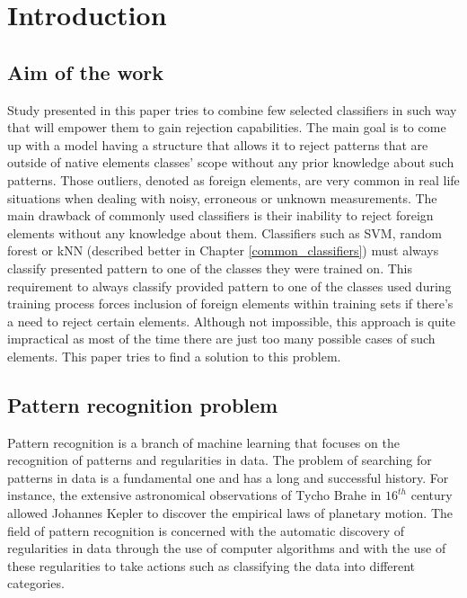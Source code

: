 \chapter{Introduction}

\section{Aim of the work}

Study presented in this paper tries to combine few selected classifiers in such way that will empower them to gain rejection capabilities. The main goal is to come up with a model having a structure that allows it to reject patterns that are outside of native elements classes' scope without any prior knowledge about such patterns. Those outliers, denoted as foreign elements, are very common in real life situations when dealing with noisy, erroneous or unknown measurements. The main drawback of commonly used classifiers is their inability to reject foreign elements without any knowledge about them. Classifiers such as SVM, random forest or kNN (described better in Chapter \ref{common_classifiers}) must always classify presented pattern to one of the classes they were trained on. This  requirement to always classify provided pattern to one of the classes used during training process forces inclusion of foreign elements within training sets if there's a need to reject certain elements. Although not impossible, this approach is quite impractical as most of the time there are just too many possible cases of such elements. This paper tries to find a solution to this problem. \\

\section{Pattern recognition problem}

Pattern recognition is a branch of machine learning that focuses on the recognition of patterns and regularities in data. The problem of searching for patterns in data is a fundamental one and has a long and successful history. For instance, the extensive astronomical observations of Tycho Brahe in $16^{th}$ century allowed Johannes Kepler to discover the empirical laws of planetary motion. The field of pattern recognition is concerned with the automatic discovery of regularities in data through the use of computer algorithms and with the use of these regularities to take actions such as classifying the data into different categories.\cite{Bishop2006} \\

